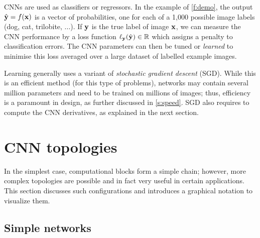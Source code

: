 CNNs are used as classifiers or regressors. In the example of \autoref{f:demo}, the output $\hat {\mathbf{y}} = f(\mathbf{x})$ is a vector of probabilities, one for each of a 1,000 possible image labels (dog, cat, trilobite, ...).  If $\mathbf{y}$ is the true label of image $\mathbf{x}$, we can measure the CNN performance by a loss function $\ell_{\mathbf{y}}(\hat {\mathbf{y}})  \in \mathbb{R}$ which assigns a penalty to classification errors. The CNN parameters can then be tuned or \emph{learned} to minimise this loss averaged over a large dataset of labelled example images.

Learning generally uses a variant of \emph{stochastic gradient descent} (SGD). While this is an efficient method (for this type of problems), networks may contain several million parameters and need to be trained on millions of images; thus, efficiency is a paramount in \matlab design, as further discussed in \autoref{s:speed}. SGD also requires to compute the CNN derivatives, as explained in the next section.

\section{CNN topologies}\label{s:cnn-topology}

In the simplest case, computational blocks form a simple chain; however, more complex topologies are possible and in fact very useful in certain applications. This section discusses such configurations and introduces a graphical notation to visualize them.

\subsection{Simple networks}\label{s:cnn-simple}


